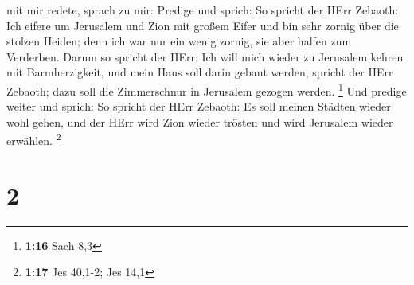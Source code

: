 mit mir redete, sprach zu mir: Predige und sprich: So spricht der HErr
Zebaoth: Ich eifere um Jerusalem und Zion mit großem Eifer 
und bin sehr zornig über die stolzen Heiden; denn ich war nur ein wenig
zornig, sie aber halfen zum Verderben.  Darum so spricht
der HErr: Ich will mich wieder zu Jerusalem kehren mit Barmherzigkeit,
und mein Haus soll darin gebaut werden, spricht der HErr Zebaoth; dazu
soll die Zimmerschnur in Jerusalem gezogen werden. \footnote{\textbf{1:16}
  Sach 8,3}  Und predige weiter und sprich: So spricht der
HErr Zebaoth: Es soll meinen Städten wieder wohl gehen, und der HErr
wird Zion wieder trösten und wird Jerusalem wieder erwählen. \footnote{\textbf{1:17}
  Jes 40,1-2; Jes 14,1}

\hypertarget{section-1}{%
\section{2}\label{section-1}}

